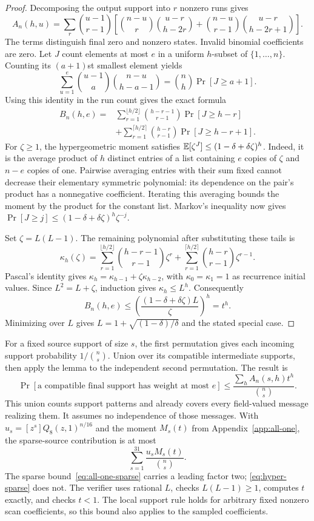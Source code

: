 \begin{proof}
Decomposing the output support into $r$ nonzero runs gives
\[
 A_n(h,u)=\sum_r\binom{u-1}{r-1}
 \left[\binom{n-u}{r}\binom{u-r}{h-2r}
       +\binom{n-u}{r-1}\binom{u-r}{h-2r+1}\right].
\]
The terms distinguish final zero and nonzero states. Invalid binomial
coefficients are zero. Let $J$ count elements at most $e$ in a uniform
$h$-subset of $\{1,\ldots,n\}$. Counting its $(a+1)$st smallest element yields
\[
 \sum_{u=1}^e\binom{u-1}{a}\binom{n-u}{h-a-1}
       =\binom nh\Pr[J\ge a+1].
\]
Using this identity in the run count gives the exact formula
\begin{align*}
 B_n(h,e)={}&\sum_{r=1}^{\lfloor h/2\rfloor}
      \binom{h-r-1}{r-1}\Pr[J\ge h-r]\\
 &+\sum_{r=1}^{\lceil h/2\rceil}
      \binom{h-r}{r-1}\Pr[J\ge h-r+1].
\end{align*}
For $\zeta\ge1$, the hypergeometric moment satisfies
$\mathbb E[\zeta^J]\le(1-\delta+\delta\zeta)^h$. Indeed, it is the average product
of $h$ distinct entries of a list containing $e$ copies of $\zeta$ and
$n-e$ copies of one. Pairwise averaging entries with their sum fixed
cannot decrease their elementary symmetric polynomial: its dependence
on the pair's product has a nonnegative coefficient. Iterating this
averaging bounds the moment by the product for the constant list.
Markov's inequality now gives
$\Pr[J\ge j]\le(1-\delta+\delta\zeta)^h\zeta^{-j}$.

Set $\zeta=L(L-1)$. The remaining polynomial after substituting these
tails is
\[
 \kappa_h(\zeta)=\sum_{r=1}^{\lfloor h/2\rfloor}\binom{h-r-1}{r-1}\zeta^r
       +\sum_{r=1}^{\lceil h/2\rceil}\binom{h-r}{r-1}\zeta^{r-1}.
\]
Pascal's identity gives $\kappa_h=\kappa_{h-1}+\zeta\kappa_{h-2}$, with
$\kappa_0=\kappa_1=1$ as recurrence initial values. Since
$L^2=L+\zeta$, induction gives $\kappa_h\le L^h$. Consequently
\[
 B_n(h,e)\le\left(\frac{(1-\delta+\delta\zeta)L}{\zeta}\right)^h=t^h.
\]
Minimizing over $L$ gives $L=1+\sqrt{(1-\delta)/\delta}$ and the
stated special case.
\end{proof}

For a fixed source support of size $s$, the first permutation gives
each incoming support probability $1/\binom ns$. Union over its
compatible intermediate supports, then apply the lemma to the independent
second permutation. The result is
\[
 \Pr[\text{a compatible final support has weight at most }e]
 \le\frac{\sum_h A_n(s,h)t^h}{\binom ns}.
\]
This union counts support patterns and already covers every field-valued
message realizing them. It assumes no independence of those messages.
With $u_s=[z^s]Q_8(z,1)^{n/16}$ and the moment $M_s(t)$ from
Appendix~\ref{app:all-one}, the sparse-source contribution is at most
\begin{equation}\label{eq:hyper-sparse}
 \sum_{s=1}^{31}\frac{u_s M_s(t)}{\binom ns}.
\end{equation}
The sparse bound~\eqref{eq:all-one-sparse} carries a leading factor two;
\eqref{eq:hyper-sparse} does not. The verifier uses rational $L$,
checks $L(L-1)\ge1$, computes $t$ exactly, and checks $t<1$.
The local support rule holds for arbitrary fixed nonzero scan
coefficients, so this bound also applies to the sampled coefficients.

